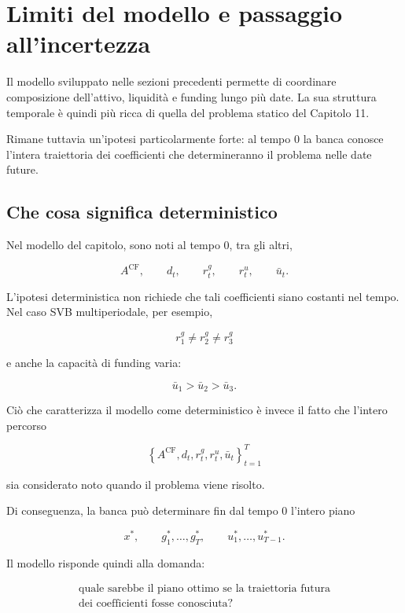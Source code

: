 \section{Limiti del modello e passaggio all'incertezza}

\label{sec:cap12-limiti-incertezza}

Il modello sviluppato nelle sezioni precedenti permette di coordinare
composizione dell'attivo, liquidit\`a e funding lungo pi\`u date. La sua
struttura temporale \`e quindi pi\`u ricca di quella del problema statico del
Capitolo 11.

Rimane tuttavia un'ipotesi particolarmente forte: al tempo $0$ la banca
conosce l'intera traiettoria dei coefficienti che determineranno il problema
nelle date future.

\subsection{Che cosa significa deterministico}

Nel modello del capitolo, sono noti al tempo $0$, tra gli altri,

\[
A^{\mathrm{CF}},
\qquad
d_t,
\qquad
r^g_t,
\qquad
r^u_t,
\qquad
\bar u_t.
\]

L'ipotesi deterministica non richiede che tali coefficienti siano costanti
nel tempo. Nel caso SVB multiperiodale, per esempio,

\[
r_1^{g}\neq r_2^{g}\neq r_3^{g}
\]

\noindent e anche la capacit\`a di funding varia:

\[
\bar u_1>\bar u_2>\bar u_3.
\]

Ci\`o che caratterizza il modello come deterministico \`e invece il fatto che
l'intero percorso

\[
\left\{
A^{\mathrm{CF}},
d_t,
r^g_t,
r^u_t,
\bar u_t
\right\}_{t=1}^{T}
\]

\noindent sia considerato noto quando il problema viene risolto.

Di conseguenza, la banca pu\`o determinare fin dal tempo $0$ l'intero piano

\[
x^*,
\qquad
g_1^*,\ldots,g_T^*,
\qquad
u_1^*,\ldots,u_{T-1}^*.
\]

Il modello risponde quindi alla domanda:

\[
\boxed{
\begin{array}{c}
\text{quale sarebbe il piano ottimo se la traiettoria futura}\\
\text{dei coefficienti fosse conosciuta?}
\end{array}
}
\]

